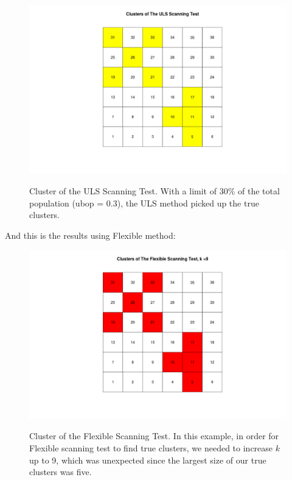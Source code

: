 \documentclass[12pt]{article}
\begin{document}
\begin{figure}[!ht]
	
	\centering
	\includegraphics[scale=0.2]{Ex2_ULS}\\
	\caption{Cluster of the ULS Scanning Test. With a limit of $30 \% $  of the total population (ubop = 0.3), the ULS method picked up the true clusters.\label{f:gull}}
	
\end{figure}



\newpage


And this is the results using Flexible method:\\

\begin{figure}[!ht]
\centering
\includegraphics[scale=0.3]{Ex2_Flexible}\\
\caption{Cluster of the Flexible Scanning Test. In this example, in order for Flexible scanning test to find true clusters, we needed to increase $k$ up to 9, which was unexpected since the largest size of our true clusters was five. \label{f:gull}}

\end{figure}
\end{document}
